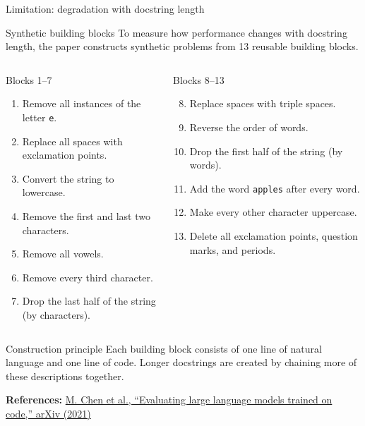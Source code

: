 \documentclass[aspectratio=43,9pt]{beamer}
\newcommand{\srclink}[2]{\href{#2}{\textcolor{black!68}{#1}}}
\newcommand{\refline}[2][References]{%
  \vfill
  {\raggedright\fontsize{5.1}{5.5}\selectfont\color{black!68}\textbf{#1:} #2\par}%
}
\newcommand{\srcChen}{\srclink{M. Chen et al., ``Evaluating large language models trained on code,'' arXiv (2021)}{https://arxiv.org/abs/2107.03374}}
\begin{document}
\begin{frame}{Limitation: degradation with docstring length}
\tiny
\begin{block}{Synthetic building blocks}
To measure how performance changes with docstring length, the paper constructs synthetic problems from 13 reusable building blocks.
\end{block}

\begin{columns}[T,totalwidth=\textwidth]
\begin{block}{Blocks 1--7}
\begin{enumerate}
  \item Remove all instances of the letter \texttt{e}.
  \item Replace all spaces with exclamation points.
  \item Convert the string to lowercase.
  \item Remove the first and last two characters.
  \item Remove all vowels.
  \item Remove every third character.
  \item Drop the last half of the string (by characters).
\end{enumerate}
\end{block}

\begin{block}{Blocks 8--13}
\begin{enumerate}
  \setcounter{enumi}{7}
  \item Replace spaces with triple spaces.
  \item Reverse the order of words.
  \item Drop the first half of the string (by words).
  \item Add the word \texttt{apples} after every word.
  \item Make every other character uppercase.
  \item Delete all exclamation points, question marks, and periods.
\end{enumerate}
\end{block}
\end{columns}

\begin{block}{Construction principle}
Each building block consists of one line of natural language and one line of code. Longer docstrings are created by chaining more of these descriptions together.
\end{block}

\refline{\srcChen}
\end{frame}
\end{document}
